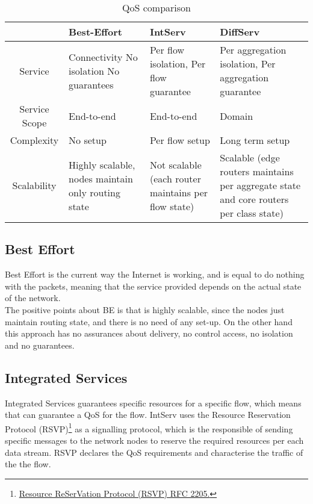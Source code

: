 \begin{table}[ht] 
\caption{QoS comparison} %
\centering %
\begin{tabular}{c || p{2.5cm} p{3.5cm} p{4.5cm}} %
\hline\hline %
  & Best-Effort & IntServ & DiffServ \\ [0.5ex] %
\hline %
Service & Connectivity No isolation  No guarantees & Per flow isolation, Per flow guarantee & Per aggregation isolation, Per aggregation guarantee \\   \hline %
Service Scope & End-to-end & End-to-end & Domain \\   \hline
Complexity & No setup & Per flow setup & Long term setup \\   \hline
Scalability & Highly scalable, nodes maintain only routing state & Not scalable (each router maintains per flow state) & Scalable (edge routers maintains per aggregate state and core routers per class state) \\ [1ex] %
\hline %
\end{tabular} 
\label{table:qosComp} %
\end{table}


\subsection{Best Effort}
\label{sec:be}

Best Effort is the current way the Internet is working, and is equal to do nothing with the packets, meaning that the service provided depends on the actual state of the network.\\

The positive points about BE is that is highly scalable, since the nodes just maintain routing state, and there is no need of any set-up. On the other hand this approach has no assurances about delivery, no control access, no isolation and no guarantees. 

\subsection{Integrated Services}
\label{sec:intserv}

Integrated Services guarantees specific resources for a specific flow, which means that can guarantee a QoS for the flow. IntServ uses the Resource Reservation Protocol (RSVP)\footnote{\href{http://tools.ietf.org/html/rfc2205}{Resource ReSerVation Protocol (RSVP) RFC 2205.}} as a signalling protocol, which is the responsible of sending specific messages to the network nodes to reserve the required resources per each data stream. RSVP declares the QoS requirements and characterise the traffic of the the flow. \\

